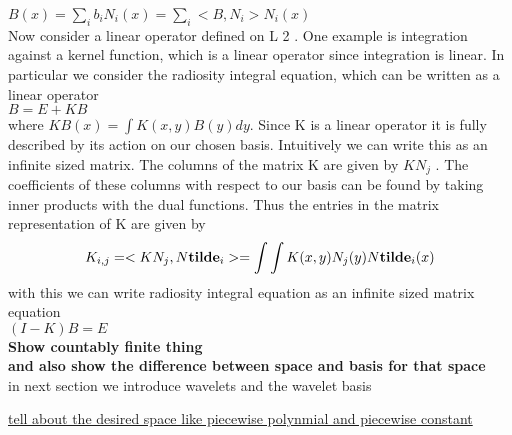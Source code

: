 $B(x) = \sum_ib_iN_i(x)= \sum_i<B,N_i>N_i(x)$\\

Now consider a linear operator defined on L 2 . One example is
integration against a kernel function, which is a linear operator since integration is linear. In particular we consider the radiosity
integral equation, which can be written as a linear operator\\

$B=E+KB$\\

where $KB(x) = \int K(x, y)B(y)dy$. Since K is a linear operator it
is fully described by its action on our chosen basis. Intuitively we
can write this as an infinite sized matrix. The columns of the matrix K are given by $KN_j$ . The coefficients of these columns with
respect to our basis can be found by taking inner products with
the dual functions. Thus the entries in the matrix representation
of K are given by\\
\begin{equation}\label{eq:kijcalc}
K_{i,j}=<KN_j,N{\bf tilde}_i>=\int \int K(x,y)N_j(y)N{\bf tilde}_i(x)
\end{equation}
with this we can write radiosity integral equation as an infinite sized matrix equation\\

$(I-K)B=E$\\

{\bf Show countably finite thing \\ and also show the difference between space and basis for that space}\\

in next section we introduce wavelets and the wavelet basis


\underline{tell about the desired space like piecewise polynmial and piecewise constant}
\\\\